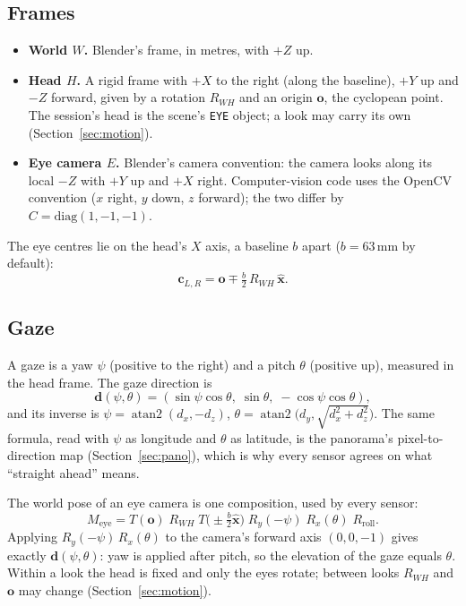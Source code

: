 \documentclass[11pt,a4paper]{article}
\newcommand{\code}[1]{\texttt{\small #1}}
\newcommand{\vb}[1]{\mathbf{#1}}
\DeclareMathOperator{\atantwo}{atan2}
\begin{document}
\subsection{Frames}\label{sec:frames}

\begin{itemize}
\item \textbf{World $W$.} Blender's frame, in metres, with $+Z$ up.
\item \textbf{Head $H$.} A rigid frame with $+X$ to the right (along the baseline), $+Y$ up and $-Z$ forward,
  given by a rotation $R_{WH}$ and an origin $\vb{o}$, the cyclopean point. The session's head is the scene's
  \code{EYE} object; a look may carry its own (Section~\ref{sec:motion}).
\item \textbf{Eye camera $E$.} Blender's camera convention: the camera looks along its local $-Z$ with $+Y$ up and
  $+X$ right. Computer-vision code uses the OpenCV convention ($x$ right, $y$ down, $z$ forward); the two differ
  by $C = \mathrm{diag}(1,-1,-1)$.
\end{itemize}

The eye centres lie on the head's $X$ axis, a baseline $b$ apart ($b = 63$\,mm by default):
\begin{equation}\label{eq:centres}
\vb{c}_{L,R} = \vb{o} \mp \tfrac{b}{2}\, R_{WH}\, \hat{\vb{x}} .
\end{equation}

\subsection{Gaze}\label{sec:gaze}

A gaze is a yaw $\psi$ (positive to the right) and a pitch $\theta$ (positive up), measured in the head frame.
The gaze direction is
\begin{equation}\label{eq:gaze}
\vb{d}(\psi,\theta) = (\sin\psi\cos\theta,\; \sin\theta,\; -\cos\psi\cos\theta),
\end{equation}
and its inverse is $\psi = \atantwo(d_x, -d_z)$, $\theta = \atantwo\bigl(d_y, \sqrt{d_x^2 + d_z^2}\bigr)$. The
same formula, read with $\psi$ as longitude and $\theta$ as latitude, is the panorama's pixel-to-direction map
(Section~\ref{sec:pano}), which is why every sensor agrees on what ``straight ahead'' means.

The world pose of an eye camera is one composition, used by every sensor:
\begin{equation}\label{eq:pose}
M_{\mathrm{eye}} = T(\vb{o})\; R_{WH}\; T\bigl(\pm\tfrac{b}{2}\hat{\vb{x}}\bigr)\; R_y(-\psi)\; R_x(\theta)\; R_{\mathrm{roll}} .
\end{equation}
Applying $R_y(-\psi)\,R_x(\theta)$ to the camera's forward axis $(0,0,-1)$ gives exactly $\vb{d}(\psi,\theta)$:
yaw is applied after pitch, so the elevation of the gaze equals $\theta$. Within a look the head is fixed and
only the eyes rotate; between looks $R_{WH}$ and $\vb{o}$ may change (Section~\ref{sec:motion}).
\end{document}
